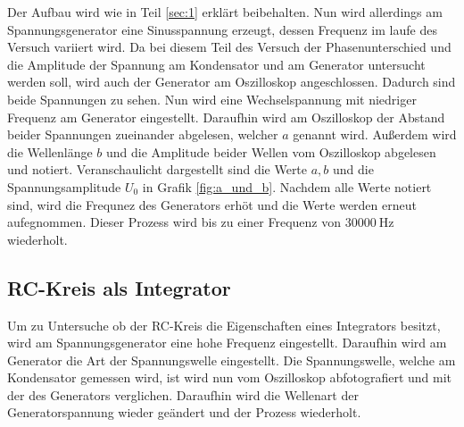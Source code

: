 Der Aufbau wird wie in Teil \ref{sec:1} erklärt beibehalten.
Nun wird allerdings am Spannungsgenerator eine Sinusspannung erzeugt, dessen Frequenz im laufe des Versuch variiert wird.
Da bei diesem Teil des Versuch der Phasenunterschied und die Amplitude der Spannung am Kondensator und am Generator untersucht werden soll, wird auch der Generator am Oszilloskop angeschlossen.
Dadurch sind beide Spannungen zu sehen.
Nun wird eine Wechselspannung mit niedriger Frequenz am Generator eingestellt.
Daraufhin wird am Oszilloskop der Abstand beider Spannungen zueinander abgelesen, welcher $a$ genannt wird.
Außerdem wird die Wellenlänge $b$ und die Amplitude beider Wellen vom Oszilloskop abgelesen und notiert.
Veranschaulicht dargestellt sind die Werte $a, b$ und die Spannungsamplitude $U_0$ in Grafik \ref{fig:a_und_b}.
Nachdem alle Werte notiert sind, wird die Frequnez des Generators erhöt und die Werte werden erneut aufegnommen.
Dieser Prozess wird bis zu einer Frequenz von $\SI{30000}{\hertz}$ wiederholt.


\subsection{RC-Kreis als Integrator}

Um zu Untersuche ob der RC-Kreis die Eigenschaften eines Integrators besitzt, wird am Spannungsgenerator eine hohe Frequenz eingestellt.
Daraufhin wird am Generator die Art der Spannungswelle eingestellt.
Die Spannungswelle, welche am Kondensator gemessen wird, ist wird nun vom Oszilloskop abfotografiert und mit der des Generators verglichen.
Daraufhin wird die Wellenart der Generatorspannung wieder geändert und der Prozess wiederholt.
